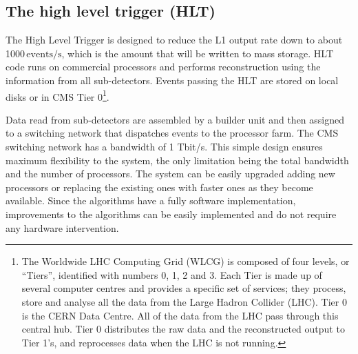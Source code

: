 \subsection{The high level trigger (HLT)}

The High Level Trigger is designed to reduce the L1 output rate down to about 1000\,$\mathrm{events/s}$, which is the amount that will be written to mass storage. HLT code runs on commercial processors and performs reconstruction using the information from all sub-detectors. Events passing
the HLT are stored on local disks or in CMS Tier 0\footnote{The Worldwide LHC Computing Grid (WLCG) is composed of four levels, or ``Tiers'', identified with numbers 0, 1, 2 and 3. Each Tier is made up of several computer centres and provides a specific set of services; they process, store and analyse all the data from the Large Hadron Collider (LHC). Tier 0 is the CERN Data Centre. All of the data from the LHC pass through this central hub. Tier 0 distributes the raw data and the reconstructed output to Tier 1's, and reprocesses data when the LHC is not running.}. 

Data read from sub-detectors are assembled by a builder unit and then assigned to a switching network that dispatches events to the processor farm. The CMS switching network has a bandwidth of 1 Tbit/s. This simple design ensures maximum flexibility to the system, the only limitation being the total bandwidth and the number of processors. The system can be easily upgraded adding new processors or replacing the existing ones with faster ones as they become available. Since the algorithms have a fully software implementation, improvements to the algorithms can be easily implemented and do not require any hardware intervention.

